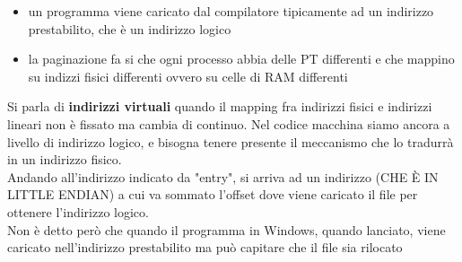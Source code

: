 \documentclass[12pt, oneside]{extbook}
\begin{document}
\begin{itemize}
\item un programma viene caricato dal compilatore tipicamente ad un indirizzo prestabilito, che è un indirizzo logico
\item la paginazione fa si che ogni processo abbia delle PT differenti e che mappino su indizzi fisici differenti ovvero su celle di RAM differenti
\end{itemize}
Si parla di \textbf{indirizzi virtuali} quando il mapping fra indirizzi fisici e indirizzi lineari non è fissato ma cambia di continuo. Nel codice macchina siamo ancora a livello di indirizzo logico, e bisogna tenere presente il meccanismo che lo tradurrà in un indirizzo fisico.\\ Andando all'indirizzo indicato da "entry", si arriva ad un indirizzo (CHE È IN LITTLE ENDIAN) a cui va sommato l'offset dove viene caricato il file per ottenere l'indirizzo logico.\\ Non è detto però che quando il programma in Windows, quando lanciato, viene caricato nell'indirizzo prestabilito ma può capitare che il file sia rilocato
\end{document}
